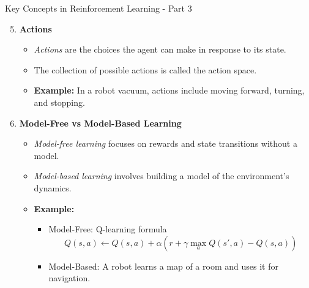 \documentclass[aspectratio=169]{beamer}
\begin{document}
\begin{frame}[fragile]{Key Concepts in Reinforcement Learning - Part 3}
    \begin{enumerate}
        \setcounter{enumi}{4}
        \item \textbf{Actions}
        \begin{itemize}
            \item \emph{Actions} are the choices the agent can make in response to its state.
            \item The collection of possible actions is called the action space.
            \item \textbf{Example:} In a robot vacuum, actions include moving forward, turning, and stopping.
        \end{itemize}
        
        \item \textbf{Model-Free vs Model-Based Learning}
        \begin{itemize}
            \item \emph{Model-free learning} focuses on rewards and state transitions without a model.
            \item \emph{Model-based learning} involves building a model of the environment's dynamics.
            \item \textbf{Example:} 
              \begin{itemize}
                  \item Model-Free: Q-learning formula
                  \begin{equation}
                  Q(s, a) \leftarrow Q(s, a) + \alpha \left( r + \gamma \max_a Q(s', a) - Q(s, a) \right)
                  \end{equation}
                  \item Model-Based: A robot learns a map of a room and uses it for navigation.
              \end{itemize}
        \end{itemize}
    \end{enumerate}
\end{frame}
\end{document}
